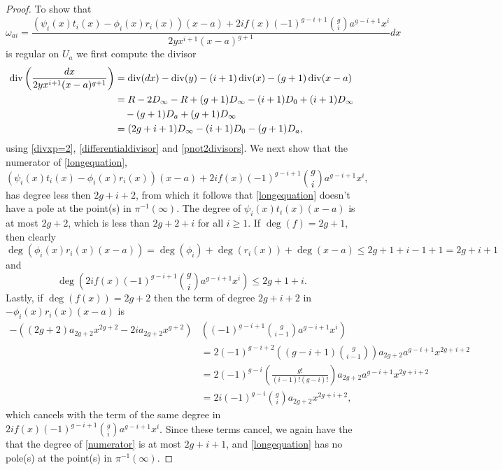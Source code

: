 \begin{proof}
    To show that
        \begin{equation}\label{longequation}
        \omega_{a i} =  \frac{(\psi_i(x)t_i(x) - \phi_i(x)r_i(x))(x-a) + 2if(x)(-1)^{g-i+1}\binom{g}{i} a^{g-i+1}x^i}{2yx^{i+1}(x-a)^{g+1}}dx
        \end{equation}
    is regular on $U_a$ we first compute the divisor
        \begin{align*}
        \operatorname{div}\left( \frac{dx}{2yx^{i+1}(x-a)^{g+1}}\right) & = \operatorname{div}(dx) - \operatorname{div}(y) - (i+1)\operatorname{div}(x) - (g+1)\operatorname{div}(x-a) \\
        & = R - 2D_\infty - R + (g+1)D_\infty - (i+1)D_0 + (i+1)D_\infty \\
        & \quad - (g+1)D_a + (g+1)D_\infty \\
        & = (2g+i+1)D_\infty -(i+1)D_0 - (g+1)D_a,
        \end{align*}
    using \eqref{divxp=2}, \eqref{differentialdivisor} and \eqref{pnot2divisors}.
    We next show that the numerator of \eqref{longequation},
        \begin{equation}\label{numerator}
        {(\psi_i(x)t_i(x) - \phi_i(x)r_i(x))(x-a) + 2if(x)(-1)^{g-i+1}\binom{g}{i} a^{g-i+1}x^i},
        \end{equation}
    has degree less then $2g+i+2$, from which it follows that \eqref{longequation} doesn't have a pole at the point(s) in $\pi^{-1}(\infty)$.
    The degree of $\psi_i(x)t_i(x)(x-a)$ is at most $2g+2$, which is less than $2g+2+i$ for all $i \geq 1$.
    If $\deg(f) = 2g+1$, then clearly
        \[
        \deg\left( \phi_i(x)r_i(x)(x-a) \right) = \deg(\phi_i) + \deg(r_i(x)) + \deg(x-a) \leq 2g+1 + i-1 +1 = 2g+i+1
        \]
    and
        \[
        \deg \left( 2if(x)(-1)^{g-i+1}\binom{g}{i} a^{g-i+1}x^i \right)  \leq  2g+1+i .
        \]
    Lastly, if $\deg(f(x)) = 2g+2$ then the term of degree $2g+i+2$ in $-\phi_i(x)r_i(x)(x-a)$ is
        \begin{align*}
        -((2g+2)a_{2g+2}x^{2g+2}-2ia_{2g+2}x^{g+2})&\left( (-1)^{g-i+1}\binom{g}{i-1}a^{g-i+1}x^i\right) \\
        &  = 2(-1)^{g-i+2}\left( (g-i+1)\binom{g}{i-1} \right) a_{2g+2}a^{g-i+1}x^{2g+i+2} \\
        & = 2(-1)^{g-i} \left( \frac{g!}{(i-1)!(g-i)!} \right) a_{2g+2}a^{g-i+1}x^{2g+i+2} \\
        & = 2i(-1)^{g-i}\binom{g}{i}a_{2g+2}x^{2g+i+2},
        \end{align*}
    which cancels with the term of the same degree in $2if(x)(-1)^{g-i+1}\binom{g}{i}a^{g-i+1}x^i$.
    Since these terms cancel, we again have the that the degree of \eqref{numerator} is at most $2g+i+1$, and \eqref{longequation} has no pole(s) at the point(s) in $\pi^{-1}(\infty)$.
    

\end{proof}
